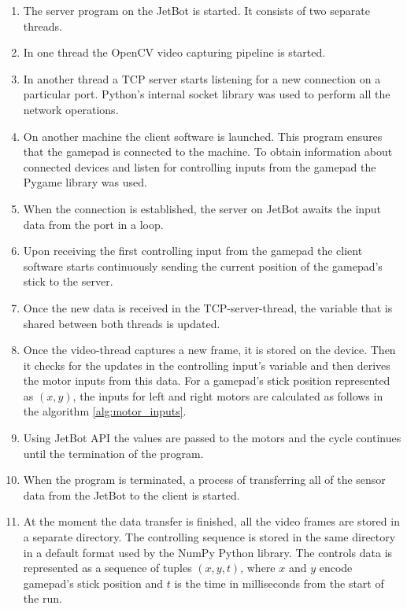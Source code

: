 \begin{enumerate}
  \item The server program on the JetBot is started. It consists of two separate threads.
  \item In one thread the OpenCV video capturing pipeline is started.
  \item In another thread a TCP server starts listening for a new connection on a particular port. Python's internal socket library was used to perform all the network operations.
  \item On another machine the client software is launched. This program ensures that the gamepad is connected to the machine. To obtain information about connected devices and listen for controlling inputs from the gamepad the Pygame library was used.
  \item When the connection is established, the server on JetBot awaits the input data from the port in a loop.
  \item Upon receiving the first controlling input from the gamepad the client software starts continuously sending the current position of the gamepad's stick to the server.
  \item Once the new data is received in the TCP-server-thread, the variable that is shared between both threads is updated.
  \item Once the video-thread captures a new frame, it is stored on the device. Then it checks for the updates in the controlling input's variable and then derives the motor inputs from this data. For a gamepad's stick position represented as $(x, y)$, the inputs for left and right motors are calculated as follows in the algorithm \ref{alg:motor_inputs}.
  \item Using JetBot API the values are passed to the motors and the cycle continues until the termination of the program.
  \item When the program is terminated, a process of transferring all of the sensor data from the JetBot to the client is started.
  \item At the moment the data transfer is finished, all the video frames are stored in a separate directory. The controlling sequence is stored in the same directory in a default format used by the NumPy Python library. The controls data is represented as a sequence of tuples $(x, y, t)$, where $x$ and $y$ encode gamepad's stick position and $t$ is the time in milliseconds from the start of the run.
\end{enumerate}


